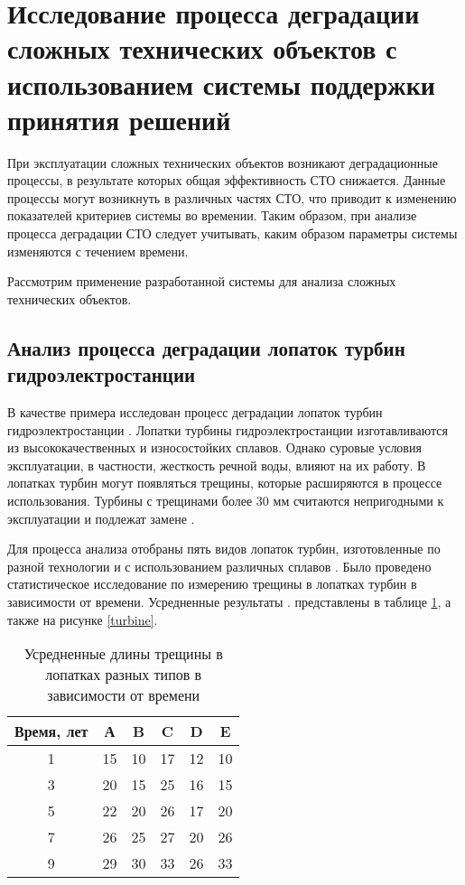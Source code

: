 \section{Исследование процесса деградации сложных технических объектов с использованием системы поддержки принятия решений}

При эксплуатации сложных технических объектов возникают деградационные процессы,
в результате которых общая эффективность СТО снижается.
Данные процессы могут возникнуть в различных частях СТО, что приводит к изменению показателей критериев системы во времении.
Таким образом, при анализе процесса деградации СТО следует учитывать, каким образом параметры системы изменяются с течением времени.

Рассмотрим применение разработанной системы для анализа сложных технических объектов.

\subsection{Анализ процесса деградации лопаток турбин гидроэлектростанции}
В качестве примера исследован процесс деградации лопаток турбин гидроэлектростанции \cite{Degradation}.
Лопатки турбины гидроэлектростанции изготавливаются из высококачественных и износостойких сплавов.
Однако суровые условия эксплуатации, в частности, жесткость речной воды, влияют на их работу.
В лопатках турбин могут появляться трещины, которые расширяются в процессе использования.
Турбины с трещинами более 30 мм считаются непригодными к эксплуатации и подлежат замене \cite{Degradation}.

Для процесса анализа отобраны пять видов лопаток турбин, изготовленные по разной технологии и с использованием различных сплавов \cite{Degradation}.
Было проведено статистическое исследование по измерению трещины в лопатках турбин в зависимости от времени.
Усредненные результаты \cite{Degradation}. представлены в таблице \ref{table:turbine}, а также на рисунке \ref{turbine}.

\begin{table}[H]
    \centering
    \caption{Усредненные длины трещины в лопатках разных типов в зависимости от времени}\label{table:turbine}
    \begin{tabular}{|c|c|c|c|c|c|}
    \hline Время, лет & А & B & C & D & E \\
    \hline 1 & 15 & 10 & 17 & 12 & 10 \\
    \hline 3 & 20 & 15 & 25 &  16 & 15 \\
    \hline 5 & 22 & 20 & 26 & 17 & 20 \\
    \hline 7 & 26 & 25 & 27 & 20 & 26 \\
    \hline 9 & 29 & 30 & 33 & 26 & 33 \\
    \hline
    \end{tabular}
\end{table}

